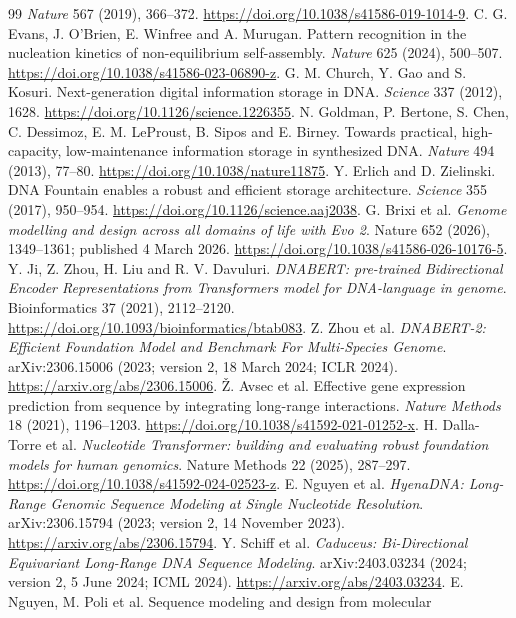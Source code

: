 \begin{thebibliography}{99}
\emph{Nature} 567 (2019), 366--372. \url{https://doi.org/10.1038/s41586-019-1014-9}.
 C. G. Evans, J. O'Brien, E. Winfree and A. Murugan. Pattern recognition
in the nucleation kinetics of non-equilibrium self-assembly. \emph{Nature} 625 (2024),
500--507. \url{https://doi.org/10.1038/s41586-023-06890-z}.
 G. M. Church, Y. Gao and S. Kosuri. Next-generation digital
information storage in DNA. \emph{Science} 337 (2012), 1628.
\url{https://doi.org/10.1126/science.1226355}.
 N. Goldman, P. Bertone, S. Chen, C. Dessimoz, E. M. LeProust,
B. Sipos and E. Birney. Towards practical, high-capacity, low-maintenance information
storage in synthesized DNA. \emph{Nature} 494 (2013), 77--80.
\url{https://doi.org/10.1038/nature11875}.
 Y. Erlich and D. Zielinski. DNA Fountain enables a robust and
efficient storage architecture. \emph{Science} 355 (2017), 950--954.
\url{https://doi.org/10.1126/science.aaj2038}.
 G. Brixi et al. \emph{Genome modelling and design across all domains of life
with Evo 2}. Nature 652 (2026), 1349--1361; published 4 March 2026.
\url{https://doi.org/10.1038/s41586-026-10176-5}.
 Y. Ji, Z. Zhou, H. Liu and R. V. Davuluri.
\emph{DNABERT: pre-trained Bidirectional Encoder Representations from Transformers
model for DNA-language in genome}. Bioinformatics 37 (2021), 2112--2120.
\url{https://doi.org/10.1093/bioinformatics/btab083}.
 Z. Zhou et al.
\emph{DNABERT-2: Efficient Foundation Model and Benchmark For Multi-Species Genome}.
arXiv:2306.15006 (2023; version 2, 18 March 2024; ICLR 2024).
\url{https://arxiv.org/abs/2306.15006}.
 \v{Z}. Avsec et al.
Effective gene expression prediction from sequence by integrating long-range
interactions. \emph{Nature Methods} 18 (2021), 1196--1203.
\url{https://doi.org/10.1038/s41592-021-01252-x}.
 H. Dalla-Torre et al.
\emph{Nucleotide Transformer: building and evaluating robust foundation models
for human genomics}. Nature Methods 22 (2025), 287--297.
\url{https://doi.org/10.1038/s41592-024-02523-z}.
 E. Nguyen et al.
\emph{HyenaDNA: Long-Range Genomic Sequence Modeling at Single Nucleotide Resolution}.
arXiv:2306.15794 (2023; version 2, 14 November 2023).
\url{https://arxiv.org/abs/2306.15794}.
 Y. Schiff et al.
\emph{Caduceus: Bi-Directional Equivariant Long-Range DNA Sequence Modeling}.
arXiv:2403.03234 (2024; version 2, 5 June 2024; ICML 2024).
\url{https://arxiv.org/abs/2403.03234}.
 E. Nguyen, M. Poli et al. Sequence modeling and design from molecular

\end{thebibliography}
